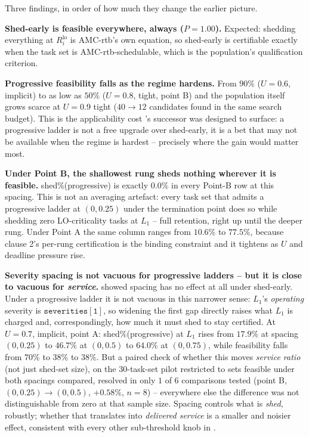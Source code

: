 \documentclass{article}
\begin{document}
Three findings, in order of how much they change the earlier picture.

\textbf{Shed-early is feasible everywhere, always ($P = 1.00$).} Expected:
shedding everything at $R_i^{\mathrm{lo}}$ is AMC-rtb's own equation, so shed-early
is certifiable exactly when the task set is AMC-rtb-schedulable, which is the
population's qualification criterion.

\textbf{Progressive feasibility falls as the regime hardens.} From $90\%$
($U=0.6$, implicit) to as low as $50\%$ ($U=0.8$, tight, point B) and the
population itself grows scarce at $U=0.9$ tight ($40 \to 12$ candidates found
in the same search budget). This is the applicability cost 's
successor was designed to surface: a progressive ladder is not a free upgrade
over shed-early, it is a bet that may not be available when the regime is
hardest -- precisely where the gain would matter most.

\textbf{Under Point B, the shallowest rung sheds nothing wherever it is
feasible.} shed\%(progressive) is exactly $0.0\%$ in every Point-B row at this
spacing. This is not an averaging artefact: every task set that admits a
progressive ladder at $(0, 0.25)$ under the termination point does so while
shedding zero LO-criticality tasks at $L_1$ -- full retention, right up until
the deeper rung. Under Point A the same column ranges from $10.6\%$ to
$77.5\%$, because clause 2's per-rung certification is the binding constraint
and it tightens as $U$ and deadline pressure rise.

\textbf{Severity spacing is not vacuous for progressive ladders -- but it is
close to vacuous for \emph{service}.}  showed
spacing has no effect at all under shed-early. Under a progressive ladder it is
not vacuous in this narrower sense: $L_1$'s \emph{operating} severity is
$\mathtt{severities[1]}$, so widening the first gap directly raises what $L_1$
is charged and, correspondingly, how much it must shed to stay certified. At
$U=0.7$, implicit, point A: shed\%(progressive) at $L_1$ rises from
$17.9\%$ at spacing $(0,0.25)$ to $46.7\%$ at $(0,0.5)$ to $64.0\%$ at
$(0,0.75)$, while feasibility falls from $70\%$ to $38\%$ to $38\%$. But a
paired check of whether this moves \emph{service ratio} (not just shed-set
size), on the $30$-task-set pilot restricted to sets feasible under both
spacings compared, resolved in only $1$ of $6$ comparisons tested (point B,
$(0,0.25) \to (0,0.5)$, $+0.58\%$, $n=8$) -- everywhere else the difference
was not distinguishable from zero at that sample size. Spacing controls what
is \emph{shed}, robustly; whether that translates into \emph{delivered
service} is a smaller and noisier effect, consistent with every other
sub-threshold knob in .
\end{document}
